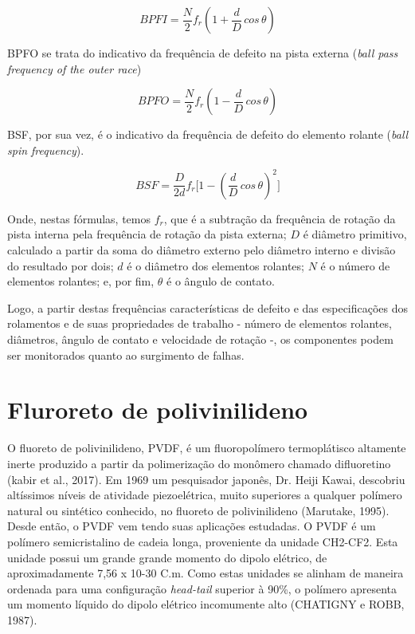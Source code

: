 \documentclass[
	12pt,				
	oneside,			
	a4paper,			
	english,			
	brazil,			
	]{abntex2ppgsi}
\begin{document}
\begin{equation}
	BPFI = \frac{N}{2}f_{r} \left ( 1 + \frac{d}{D} \,cos \, \theta \right ) 
	\label{eq: BPFI}
\end{equation}


BPFO se trata do indicativo da frequência de defeito na pista externa (\textit{ball pass frequency of the outer race})

\begin{equation}
	BPFO = \frac{N}{2}f_{r} \left ( 1 - \frac{d}{D} \,cos \, \theta \right )
	\label{eq: BPFO}
\end{equation}


BSF, por sua vez, é o indicativo da frequência de defeito do elemento rolante (\textit{ball spin frequency}).

\begin{equation}
	BSF = \frac{D}{2d}f_{r} \Bigg[  1 - \left ( \frac{d}{D} \,cos \, \theta \right ) ^{2}  \Bigg]
	\label{eq: BSF}
\end{equation}


Onde, nestas fórmulas, temos $f_{r}$, que é a subtração da frequência de rotação da pista interna pela frequência de rotação da pista externa; $D$ é diâmetro primitivo, calculado a partir da soma do diâmetro externo pelo diâmetro interno e divisão do resultado por dois; $d$ é o diâmetro dos elementos rolantes; $N$ é o número de elementos rolantes; e, por fim, $\theta$ é o ângulo de contato.

Logo, a partir destas frequências características de defeito e das especificações dos rolamentos e de suas propriedades de trabalho - número de elementos rolantes, diâmetros, ângulo de contato e velocidade de rotação -, os componentes podem ser monitorados quanto ao surgimento de falhas.  

\section{\textbf{Fluroreto de polivinilideno}}

O fluoreto de polivinilideno, PVDF, é um fluoropolímero termoplátisco altamente inerte produzido a partir da polimerização do monômero chamado difluoretino (kabir et al., 2017). Em 1969 um pesquisador japonês, Dr. Heiji Kawai, descobriu altíssimos níveis de atividade piezoelétrica, muito superiores a qualquer polímero natural ou sintético conhecido, no fluoreto de polivinilideno (Marutake, 1995). Desde então, o PVDF vem tendo suas aplicações estudadas. O PVDF é um polímero semicristalino de cadeia longa, proveniente da unidade CH2-CF2. Esta unidade possui um grande grande momento do dipolo elétrico, de aproximadamente 7,56 x 10-30 C.m. Como estas unidades se alinham de maneira ordenada para uma configuração \textit{head-tail} superior à 90\%, o polímero apresenta um momento líquido do dipolo elétrico incomumente alto (CHATIGNY e ROBB, 1987).
\end{document}
